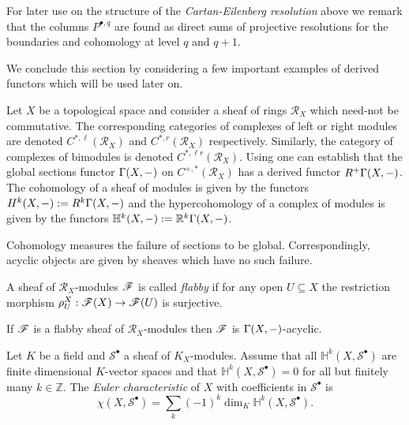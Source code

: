 For later use on the structure of the {\it Cartan-Eilenberg resolution} above we remark that the columns $P^{\bullet,q}$ are found as direct sums of projective resolutions for the boundaries and cohomology at level $q$ and $q+1$.

We conclude this section by considering a few important examples of derived functors which will be used later on.

Let $X$ be a topological space and consider a sheaf of rings $\mathcal{R}_X$ which need-not be commutative.
The corresponding categories of complexes of left or right modules are denoted $C^{*,\ell}(\mathcal{R}_X)$ and $C^{*,r}(\mathcal{R}_X)$ respectively.
Similarly, the category of complexes of bimodules is denoted $C^{*,\ell r}(\mathcal{R}_X)$.
Using  one can establish that the global sections functor $\Gamma(X,{-})$ on $C^{+,*}(\mathcal{R}_X)$ has a derived functor $R^+\Gamma(X,{-})$.
The cohomology of a sheaf of modules is given by the functors $H^k(X,{-}) := R^k \Gamma(X,{-})$ and the hypercohomology of a complex of modules is given by the functors $\mathbb{H}^k(X,{-}):= \mathbb{R}^k\Gamma(X,{-})$.

Cohomology measures the failure of sections to be global.
Correspondingly, acyclic objects are given by sheaves which have no such failure.
\begin{definition}
 A sheaf of $\mathcal{R}_X$-modules $\mathscr{F}$ is called {\it flabby} if for any open $U\subseteq X$ the restriction morphism $\rho_U^X:\mathscr{F}(X)\to\mathscr{F}(U) $ is surjective.
\end{definition}
\begin{proposition}{\cite[Proposition 2.1.8.]{dimca2004sheaves}}
 If $\mathscr{F}$ is a flabby sheaf of $\mathcal{R}_X$-modules then $\mathscr{F}$ is $\Gamma(X,{-})$-acyclic.
\end{proposition}
\begin{definition}
  Let $K$ be a field and $\mathcal{S}^\bullet$ a sheaf of $K_X$-modules.
  Assume that all $\mathbb{H}^k(X,\mathcal{S}^\bullet)$ are finite dimensional $K$-vector spaces and that $\mathbb{H}^k(X,\mathcal{S}^\bullet) = 0$ for all but finitely many $k\in \mathbb{Z}$.
  The {\it Euler characteristic} of $X$ with coefficients in $\mathcal{S}^\bullet$ is
  $$\chi(X,\mathcal{S}^\bullet) = \sum_k (-1)^k \dim_K \mathbb{H}^k(X,\mathcal{S}^\bullet).$$
\end{definition}

